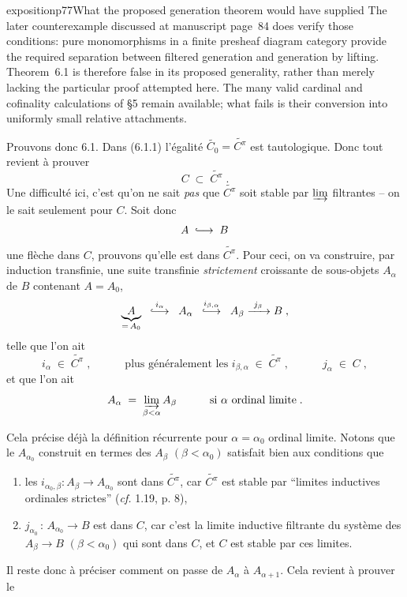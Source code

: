 \begin{dcomment}{exposition}{p77}{What the proposed generation theorem would have supplied}
The later counterexample discussed at manuscript page~84 does verify those conditions: pure monomorphisms in a finite presheaf diagram category provide the required separation between filtered generation and generation by lifting. Theorem~6.1 is therefore false in its proposed generality, rather than merely lacking the particular proof attempted here. The many valid cardinal and cofinality calculations of \S5 remain available; what fails is their conversion into uniformly small relative attachments.
\end{dcomment}


Prouvons donc 6.1. Dans (6.1.1) l'égalité $\widetilde{C_{0}} = \widetilde{C^{\pi}}$ est tautologique. Donc tout revient à prouver
\[
C \;\subset\; \widetilde{C^{\pi}} \; .
\]
Une difficulté ici, c'est qu'on ne sait \textit{pas} que $\widetilde{C^{\pi}}$ soit stable par $\varinjlim$ filtrantes -- on le sait seulement pour $C$. Soit donc
\[
A \;\into\; B
\]
une flèche dans $C$, prouvons qu'elle est dans $\widetilde{C^{\pi}}$. Pour ceci, on va construire, par induction transfinie, une suite transfinie \textit{strictement} croissante de sous-objets $A_{\alpha}$ de $B$ contenant $A = A_{0}$,
\[
\underbrace{A}_{=\,A_{0}} \;\; \overset{i_{\alpha}}{\into} \;\; A_{\alpha} \;\; \overset{i_{\beta,\alpha}}{\into} \;\; A_{\beta} \xrightarrow{\ j_{\beta}\ } B \; ,
\]
telle que l'on ait
\[
i_{\alpha} \;\in\; \widetilde{C^{\pi}} \; , \qquad\quad \text{plus généralement les } i_{\beta,\alpha} \;\in\; \widetilde{C^{\pi}} \; , \qquad\quad j_{\alpha} \;\in\; C \; ,
\]
et que l'on ait
\[
A_{\alpha} \;=\; \varinjlim_{\beta<\alpha} A_{\beta} \qquad\quad \text{si } \alpha \text{ ordinal limite} \; .
\]

Cela précise déjà la définition récurrente pour $\alpha = \alpha_{0}$ ordinal limite. Notons que le $A_{\alpha_{0}}$ construit en termes des $A_{\beta}$ $(\beta < \alpha_{0})$ satisfait bien aux conditions que
\begin{enumerate}[label={}]
\item[\textit{a})] les $i_{\alpha_{0},\beta} : A_{\beta} \longrightarrow A_{\alpha_{0}}$ sont dans $\widetilde{C^{\pi}}$, car $\widetilde{C^{\pi}}$ est stable par ``limites inductives ordinales strictes'' (\textit{cf.} 1.19, p. 8),
\item[\textit{b})] $j_{\alpha_{0}} \, : \, A_{\alpha_{0}} \longrightarrow B$ est dans $C$, car c'est la limite inductive filtrante du système des $A_{\beta} \longrightarrow B$ $(\beta < \alpha_{0})$ qui sont dans $C$, et $C$ est stable par ces limites.
\end{enumerate}
Il reste donc à préciser comment on passe de $A_{\alpha}$ à $A_{\alpha+1}$. Cela revient à prouver le

